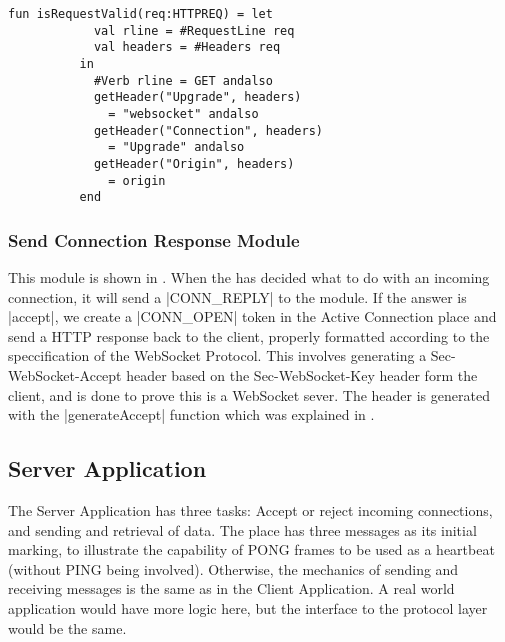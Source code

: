 		\begin{lstlisting}[label=isRequestValid,caption=isRequestValid,gobble=2,float]
		 fun isRequestValid(req:HTTPREQ) = let
            val rline = #RequestLine req
            val headers = #Headers req
          in
            #Verb rline = GET andalso
            getHeader("Upgrade", headers) 
              = "websocket" andalso
            getHeader("Connection", headers) 
              = "Upgrade" andalso
            getHeader("Origin", headers) 
              = origin 
          end
		\end{lstlisting}
		
	\subsubsection{Send Connection Response Module}
		
		
		This module is shown in . When the  has decided what to do with an incoming connection, it will send
		a |CONN_REPLY| to the  module.
		If the answer is |accept|, we create a |CONN_OPEN| token in the
		Active Connection place and send a HTTP response back to the client, properly
		formatted according to the speccification of the WebSocket Protocol. This
		involves generating a Sec-WebSocket-Accept header based on the
		Sec-WebSocket-Key header form the client, and is done to prove this is a
		WebSocket sever. The header is generated with the |generateAccept| function
		which was explained in .
		
\subsection{Server Application}
	
	
	The Server Application has three tasks: Accept or reject incoming connections,
	and sending and retrieval of data. The  place has three
	messages as its initial marking, to illustrate the capability of PONG frames
	to be used as a heartbeat (without PING being involved). Otherwise, the
	mechanics of sending and receiving messages is the same as in the Client
	Application. A real world application would have more logic here, but the
	interface to the protocol layer would be the same.
